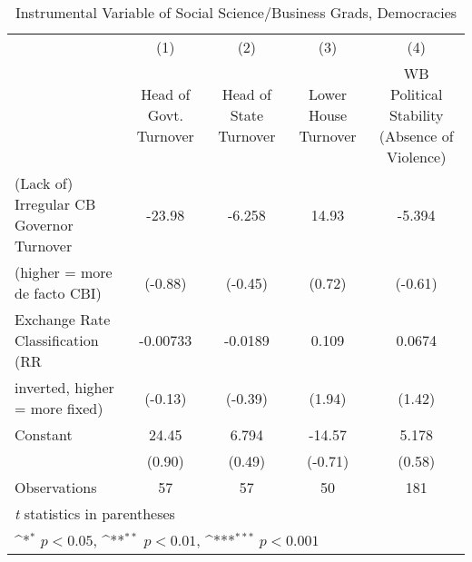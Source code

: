 \begin{table}[htbp]\centering
\def\sym#1{\ifmmode^{#1}\else\(^{#1}\)\fi}
\caption{Instrumental Variable of Social Science/Business Grads, Democracies \label{demIfivs4}}
\begin{tabular}{l*{4}{c}}
\toprule
                                        &\multicolumn{1}{c}{(1)}&\multicolumn{1}{c}{(2)}&\multicolumn{1}{c}{(3)}&\multicolumn{1}{c}{(4)}\\
                                        &\multicolumn{1}{c}{Head of Govt. Turnover}&\multicolumn{1}{c}{Head of State Turnover}&\multicolumn{1}{c}{Lower House Turnover}&\multicolumn{1}{c}{WB Political Stability (Absence of Violence)}\\
\midrule
(Lack of) Irregular CB Governor Turnover&   -23.98         &   -6.258         &    14.93         &   -5.394         \\
(higher = more de facto CBI)            &  (-0.88)         &  (-0.45)         &   (0.72)         &  (-0.61)         \\
\addlinespace
Exchange Rate Classification (RR        & -0.00733         &  -0.0189         &    0.109         &   0.0674         \\
inverted, higher = more fixed)          &  (-0.13)         &  (-0.39)         &   (1.94)         &   (1.42)         \\
\addlinespace
Constant                                &    24.45         &    6.794         &   -14.57         &    5.178         \\
                                        &   (0.90)         &   (0.49)         &  (-0.71)         &   (0.58)         \\
\midrule
Observations                            &       57         &       57         &       50         &      181         \\
\bottomrule
\multicolumn{5}{l}{\footnotesize \textit{t} statistics in parentheses}\\
\multicolumn{5}{l}{\footnotesize \sym{*} \(p<0.05\), \sym{**} \(p<0.01\), \sym{***} \(p<0.001\)}\\
\end{tabular}
\end{table}

